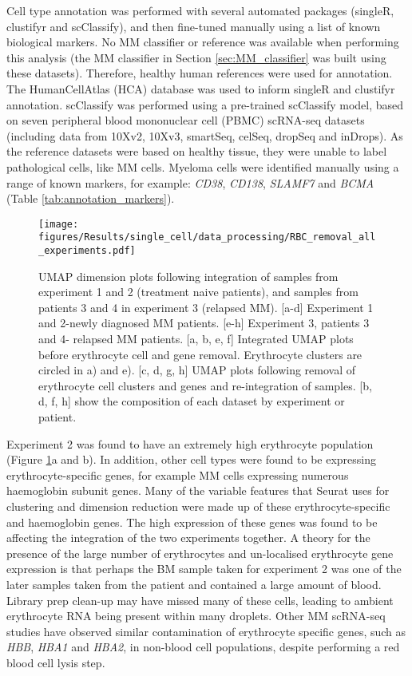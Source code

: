 Cell type annotation was performed with several automated packages (singleR, clustifyr and scClassify), and then fine-tuned manually using a list of known biological markers.
No MM classifier or reference was available when performing this analysis (the MM classifier in Section \ref{sec:MM_classifier} was built using these datasets).
Therefore, healthy human references were used for annotation.
The HumanCellAtlas (HCA) database was used to inform singleR and clustifyr annotation.
scClassify was performed using a pre-trained scClassify model, based on seven peripheral blood mononuclear cell (PBMC) scRNA-seq datasets (including data from 10Xv2, 10Xv3, smartSeq, celSeq, dropSeq and inDrops).
As the reference datasets were based on healthy tissue, they were unable to label pathological cells, like MM cells.
Myeloma cells were identified manually using a range of known markers, for example: \textit{CD38}, \textit{CD138}, \textit{SLAMF7} and \textit{BCMA} (Table \ref{tab:annotation_markers}).

\begin{figure}[htb]
    \centering
    \texttt{[image: figures/Results/single\_cell/data\_processing/RBC\_removal\_all\_experiments.pdf]}
    \caption[Erythrocyte removal from integrated scRNA-seq datasets]{UMAP dimension plots following integration of samples from experiment 1 and 2 (treatment naive patients), and samples from patients 3 and 4 in experiment 3 (relapsed MM).
    [a-d] Experiment 1 and 2-newly diagnosed MM patients.
    [e-h] Experiment 3, patients 3 and 4- relapsed MM patients.
     [a, b, e, f] Integrated UMAP plots before erythrocyte cell and gene removal. Erythrocyte clusters are circled in a) and e).
     [c, d, g, h] UMAP plots following removal of erythrocyte cell clusters and genes and re-integration of samples.
     [b, d, f, h] show the composition of each dataset by experiment or patient.}
    \label{fig:umap_RBC}
\end{figure}

Experiment 2 was found to have an extremely high erythrocyte population (Figure \ref{fig:umap_RBC}a and b).
In addition, other cell types were found to be expressing erythrocyte-specific genes, for example MM cells expressing numerous haemoglobin subunit genes.
Many of the variable features that Seurat uses for clustering and dimension reduction were made up of these erythrocyte-specific and haemoglobin genes.
The high expression of these genes was found to be affecting the integration of the two experiments together.
A theory for the presence of the large number of erythrocytes and un-localised erythrocyte gene expression is that perhaps the BM sample taken for experiment 2 was one of the later samples taken from the patient and contained a large amount of blood.
Library prep clean-up may have missed many of these cells, leading to ambient erythrocyte RNA being present within many droplets.
Other MM scRNA-seq studies have observed similar contamination of erythrocyte specific genes, such as \textit{HBB}, \textit{HBA1} and \textit{HBA2}, in non-blood cell populations, despite performing a red blood cell lysis step\cite{chen2021cryopreservation}.

